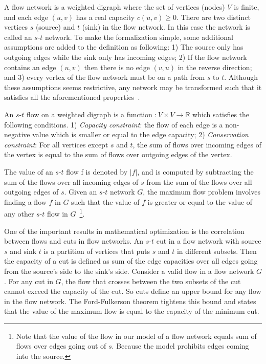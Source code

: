 \documentclass{llncs}
\begin{document}
A flow network is a weighted digraph where the set of vertices (nodes) $V$ is finite, and each edge $(u, v)$ has a real capacity $c (u, v) \geq 0$. There are two distinct vertices $s$ (source) and $t$ (sink) in the flow network. In this case the network is called an $s$-$t$ network. To make the formalization simple, some additional assumptions are added to the definition as following: 1) The source only has outgoing edges while the sink only has incoming edges; 2) If the flow network contains an edge $(u, v)$ then there is no edge $(v, u)$ in the reverse direction; and 3) every vertex of the flow network must be on a path from $s$ to $t$. Although these assumptions seems restrictive, any network may be transformed such that it satisfies all the aforementioned properties~\cite{CLRS09}.

An $s$-$t$ flow on a weighted digraph is a function $\colon V \times V \rightarrow \mathbb{R}$ which satisfies the following conditions. 1) \emph{Capacity constraint}: the flow of each edge is a non-negative value which is smaller or equal to the edge capacity; 2) \emph{Conservation constraint}: For all vertices except $s$ and $t$, the sum of flows over incoming edges of the vertex is equal to the sum of flows over outgoing edges of the vertex.

The value of an $s$-$t$ flow f is denoted by $|f|$, and is computed by subtracting the sum of the flows over all incoming edges of $s$ from the sum of the flows over all outgoing edges of $s$. Given an $s$-$t$ network $G$, the maximum flow problem involves finding a flow $f$ in $G$ such that the value of $f$ is greater or equal to the value of any other $s$-$t$ flow in $G$~\footnote{Note that the value of the flow in our model of a flow network equals sum of flows over edges going out of $s$. Because the model prohibits edges coming into the source.}.

One of the important results in mathematical optimization is the correlation between flows and cuts in flow networks. An $s$-$t$ cut in a flow network with source $s$ and sink $t$ is a partition of vertices that puts $s$ and $t$ in different subsets. Then the capacity of a cut is defined as sum of the edge capacities over all edges going from the source's side to the sink's side. Consider a valid flow in a flow network $G$. For any cut in $G$, the flow that crosses between the two subsets of the cut cannot exceed the capacity of the cut. So cuts define an upper bound for any flow in the flow network. The Ford-Fulkerson theorem tightens this bound and states that the value of the maximum flow is equal to the capacity of the minimum cut.
\end{document}
